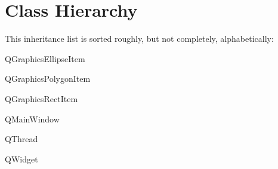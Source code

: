 \section{Class Hierarchy}
This inheritance list is sorted roughly, but not completely, alphabetically\-:\begin{DoxyCompactList}
\item {}
\item {}
\item {}
\item Q\-Graphics\-Ellipse\-Item\begin{DoxyCompactList}
\item {}
\item {}
\end{DoxyCompactList}
\item Q\-Graphics\-Polygon\-Item\begin{DoxyCompactList}
\item {}
\end{DoxyCompactList}
\item Q\-Graphics\-Rect\-Item\begin{DoxyCompactList}
\item {}
\end{DoxyCompactList}
\item Q\-Main\-Window\begin{DoxyCompactList}
\item {}
\end{DoxyCompactList}
\item Q\-Thread\begin{DoxyCompactList}
\item {}
\end{DoxyCompactList}
\item Q\-Widget\begin{DoxyCompactList}
\item {}
\end{DoxyCompactList}
\item {}
\end{DoxyCompactList}
